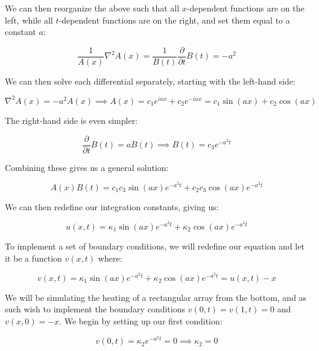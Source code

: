 \documentclass[a4paper,10pt,english]{article}
\begin{document}
We can then reorganize the above such that all $x$-dependent functions are on the left, while all $t$-dependent functions are on the right, and set them equal to a constant $a$:

\begin{equation*}
\frac{1}{A(x)} \nabla^2 A(x) = \frac{1}{B(t)} \frac{\partial}{\partial t} B(t) = -a^2
\end{equation*}

We can then solve each differential separately, starting with the left-hand side:

\begin{equation*}
\nabla^2 A(x) = -a^2 A(x) \implies A(x) = c_1 e^{iax} + c_2 e^{-iax} = c_1 \sin (ax) + c_2 \cos (ax)
\end{equation*}

The right-hand side is even simpler:

\begin{equation*}
\frac{\partial}{\partial t} B(t) = a B(t) \implies B(t) = c_3 e^{-a^2 t}
\end{equation*}

Combining these gives us a general solution:

\begin{equation*}
A(x)B(t) = c_1 c_3 \sin( ax ) e^{-a^2 t} + c_2 c_3 \cos(ax) e^{-a^2 t}
\end{equation*}

We can then redefine our integration constants, giving us:

\begin{equation*}
u(x,t) = \kappa_1 \sin( ax ) e^{-a^2 t} + \kappa_2 \cos(ax) e^{-a^2 t}
\end{equation*}

To implement a set of boundary conditions, we will redefine our equation and let it be a function $v(x,t)$ where:

\begin{equation*}
v(x,t) = \kappa_1 \sin( ax ) e^{-a^2 t} + \kappa_2 \cos(ax) e^{-a^2 t} = u(x,t) - x
\end{equation*}

We will be simulating the heating of a rectangular array from the bottom, and as such wish to implement the boundary conditions $v(0,t) = v(1,t) = 0$ and $v(x,0) = -x$.  We begin by setting up our first condition:

\begin{equation*}
v(0,t) = \kappa_2 e^{-a^2 t} = 0 \implies \kappa_2 = 0
\end{equation*}
\end{document}
